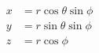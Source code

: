 \documentclass[preview]{standalone}
\begin{document}
\begin{equation}
\begin{split}
x &= r \cos \theta \sin \phi \\
y &= r \sin \theta \sin \phi \\
z &= r \cos \phi
\end{split}
\end{equation}
\end{document}
